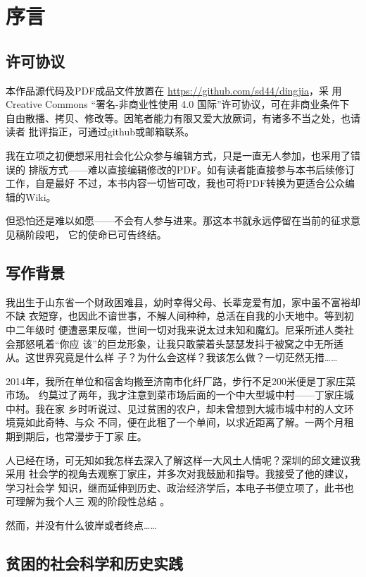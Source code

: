 \chapter{序言}
\label{chap:preface}

\section*{许可协议}

本作品源代码及PDF成品文件放置在 \url{https://github.com/sd44/dingjia}，采
用 Creative Commons “署名-非商业性使用 4.0 国际”许可协议，可在非商业条件下
自由散播、拷贝、修改等。因笔者能力有限又爱大放厥词，有诸多不当之处，也请读者
批评指正，可通过github或邮箱联系。

我在立项之初便想采用社会化公众参与编辑方式，只是一直无人参加，也采用了错误的
排版方式——难以直接编辑修改的PDF。如有读者能直接参与本书后续修订工作，自是最好
不过，本书内容一切皆可改，我也可将PDF转换为更适合公众编辑的Wiki。

但恐怕还是难以如愿——不会有人参与进来。那这本书就永远停留在当前的征求意见稿阶段吧，
它的使命已可告终结。

\section*{写作背景}

我出生于山东省一个财政困难县，幼时幸得父母、长辈宠爱有加，家中虽不富裕却不缺
衣短穿，也因此不谙世事，不解人间种种，总活在自我的小天地中。等到初中二年级时
便遭恶果反噬，世间一切对我来说太过未知和魔幻。尼采所述人类社会那怒吼着“你应
该”的巨龙形象，让我只敢蒙着头瑟瑟发抖于被窝之中无所适从。这世界究竟是什么样
子？为什么会这样？我该怎么做？一切茫然无措……

2014年，我所在单位和宿舍均搬至济南市化纤厂路，步行不足200米便是丁家庄菜市场。
约莫过了两年，我才注意到菜市场后面的一个中大型城中村——丁家庄城中村。我在家
乡时听说过、见过贫困的农户，却未曾想到大城市城中村的人文环境竟如此奇特、与众
不同，便在此租了一个单间，以求近距离了解。一两个月租期到期后，也常漫步于丁家
庄。

人已经在场，可无知如我怎样去深入了解这样一大风土人情呢？深圳的邱文建议我采用
社会学的视角去观察丁家庄，并多次对我鼓励和指导。我接受了他的建议，学习社会学
知识，继而延伸到历史、政治经济学后，本电子书便立项了，此书也可理解为我个人三
观的阶段性总结%
。

然而，并没有什么彼岸或者终点……

\section*{贫困的社会科学和历史实践}

